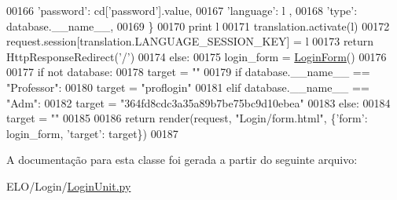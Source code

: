\begin{DoxyCode}
00166                                 \textcolor{stringliteral}{'password'}: cd[\textcolor{stringliteral}{'password'}].value,
00167                                 \textcolor{stringliteral}{'language'}: l ,
00168                                 \textcolor{stringliteral}{'type'}: database.\_\_name\_\_,
00169                             \}
00170                 \textcolor{keywordflow}{print} l
00171                 translation.activate(l)
00172                 request.session[translation.LANGUAGE\_SESSION\_KEY] = l
00173                 \textcolor{keywordflow}{return} HttpResponseRedirect(\textcolor{stringliteral}{'/'})
00174         \textcolor{keywordflow}{else}:
00175             login\_form = \hyperlink{classLogin_1_1forms_1_1LoginForm}{LoginForm}()
00176 
00177             \textcolor{keywordflow}{if} \textcolor{keywordflow}{not} database:
00178                 target = \textcolor{stringliteral}{""}
00179             \textcolor{keywordflow}{if} database.\_\_name\_\_ == \textcolor{stringliteral}{"Professor"}:
00180                 target = \textcolor{stringliteral}{"proflogin"}
00181             \textcolor{keywordflow}{elif} database.\_\_name\_\_ == \textcolor{stringliteral}{"Adm"}:
00182                 target = \textcolor{stringliteral}{"364fd8cdc3a35a89b7be75bc9d10ebea"}
00183             \textcolor{keywordflow}{else}:
00184                 target = \textcolor{stringliteral}{""}
00185 
00186             \textcolor{keywordflow}{return} render(request, \textcolor{stringliteral}{"Login/form.html"}, \{\textcolor{stringliteral}{'form'}: login\_form, \textcolor{stringliteral}{'target'}: target\})
00187 

\end{DoxyCode}


A documentação para esta classe foi gerada a partir do seguinte arquivo\-:\begin{DoxyCompactItemize}
\item 
E\-L\-O/\-Login/\hyperlink{LoginUnit_8py}{Login\-Unit.\-py}\end{DoxyCompactItemize}
